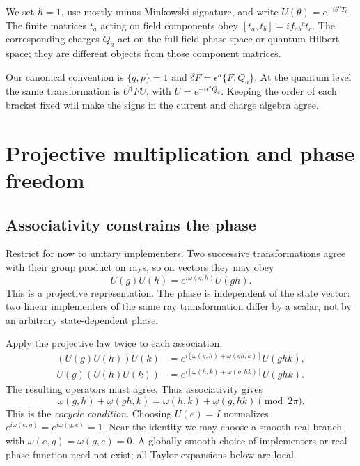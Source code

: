 \documentclass[11pt]{article}
\begin{document}
\begin{keyidea}
We set \(\hbar=1\), use mostly-minus Minkowski signature, and write
\(U(\theta)=e^{-i\theta^aT_a}\). The finite matrices \(t_a\) acting on
field components obey \([t_a,t_b]=if_{ab}{}^ct_c\). The corresponding
charges \(Q_a\) act on the full field phase space or quantum Hilbert
space; they are different objects from those component matrices.

Our canonical convention is \(\{q,p\}=1\) and
\(\delta F=\epsilon^a\{F,Q_a\}\). At the quantum level the same
transformation is \(U^\dagger F U\), with
\(U=e^{-i\epsilon^aQ_a}\). Keeping the order of each bracket fixed will
make the signs in the current and charge algebra agree.
\end{keyidea}

\section{Projective multiplication and phase freedom}
\label{sec:projective}
\subsection{Associativity constrains the phase}
Restrict for now to unitary implementers. Two successive transformations
agree with their group product on rays, so on vectors they may obey
\begin{equation}
 \boxed{U(g)U(h)=e^{i\omega(g,h)}U(gh).}
 \label{eq:projective-law}
\end{equation}
This is a projective representation. The phase is independent of the
state vector: two linear implementers of the same ray transformation
differ by a scalar, not by an arbitrary state-dependent phase.

Apply the projective law twice to each association:
\begin{align*}
 (U(g)U(h))U(k)&=e^{i[\omega(g,h)+\omega(gh,k)]}U(ghk),\\
 U(g)(U(h)U(k))&=e^{i[\omega(h,k)+\omega(g,hk)]}U(ghk).
\end{align*}
The resulting operators must agree. Thus associativity gives
\begin{equation}
 \omega(g,h)+\omega(gh,k)
 =\omega(h,k)+\omega(g,hk)\pmod{2\pi}.
 \label{eq:group-cocycle}
\end{equation}
This is the \emph{cocycle condition}. Choosing \(U(e)=I\) normalizes
\(e^{i\omega(e,g)}=e^{i\omega(g,e)}=1\). Near the identity we may choose
a smooth real branch with \(\omega(e,g)=\omega(g,e)=0\).
A globally smooth choice of implementers or real phase function need not
exist; all Taylor expansions below are local.
\end{document}
